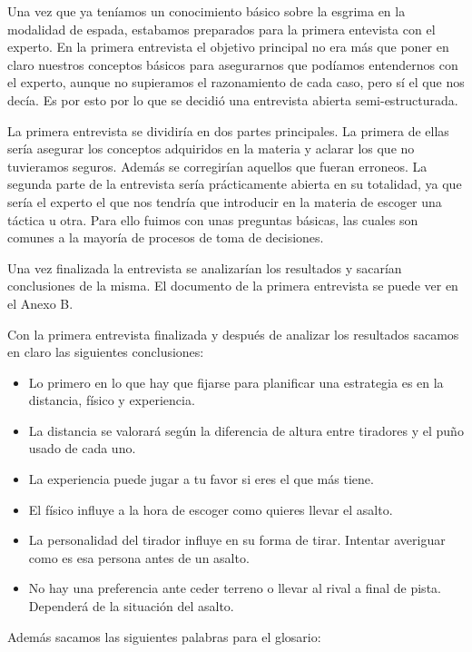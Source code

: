 Una vez que ya teníamos un conocimiento básico sobre la esgrima en la modalidad de espada,
estabamos preparados para la primera entevista con el experto. En la primera entrevista el
objetivo principal no era más que poner en claro nuestros conceptos básicos para asegurarnos
que podíamos entendernos con el experto, aunque no supieramos el razonamiento de cada caso,
pero sí el que nos decía. Es por esto por lo que se decidió una entrevista abierta semi-estructurada.

La primera entrevista se dividiría en dos partes principales. La primera de ellas sería
asegurar los conceptos adquiridos en la materia y aclarar los que no tuvieramos seguros.
Además se corregirían aquellos que fueran erroneos. La segunda parte de la entrevista
sería prácticamente abierta en su totalidad, ya que sería el experto el que nos tendría
que introducir en la materia de escoger una táctica u otra. Para ello fuimos con unas
preguntas básicas, las cuales son comunes a la mayoría de procesos de toma de decisiones.

Una vez finalizada la entrevista se analizarían los resultados y sacarían conclusiones de la misma.
El documento de la primera entrevista se puede ver en el Anexo B.

Con la primera entrevista finalizada y después de analizar los resultados sacamos en claro
las siguientes conclusiones:

\begin{itemize}
  \item Lo primero en lo que hay que fijarse para planificar una estrategia es en la distancia,
    físico y experiencia.
  \item La distancia se valorará según la diferencia de altura entre tiradores y el puño usado
    de cada uno.
  \item La experiencia puede jugar a tu favor si eres el que más tiene.
  \item El físico influye a la hora de escoger como quieres llevar el asalto.
  \item La personalidad del tirador influye en su forma de tirar. Intentar averiguar como es esa persona
    antes de un asalto.
  \item No hay una preferencia ante ceder terreno o llevar al rival a final de pista. Dependerá de la
    situación del asalto.
\end{itemize}

Además sacamos las siguientes palabras para el glosario:

